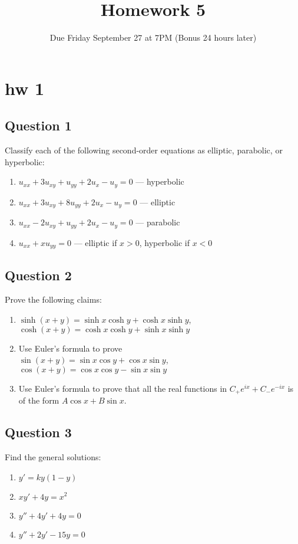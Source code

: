 \documentclass[lang=en,11pt]{template}
\title{Homework 5}
\author{}
\date{Due Friday September 27 at 7PM (Bonus 24 hours later)}
\begin{document}
   

\chapter{hw 1}
\section*{Question 1}
Classify each of the following second-order equations as elliptic, parabolic, or hyperbolic:
\begin{enumerate}
    \item $u_{xx} + 3u_{xy} + u_{yy} + 2u_x - u_y = 0$ --- hyperbolic
    \item $u_{xx} + 3u_{xy} + 8u_{yy} + 2u_x - u_y = 0$ --- elliptic
    \item $u_{xx} - 2u_{xy} + u_{yy} + 2u_x - u_y = 0$ --- parabolic
    \item $u_{xx} + xu_{yy} = 0$ --- elliptic if $x > 0$, hyperbolic if $x < 0$
\end{enumerate}

\section*{Question 2}
Prove the following claims:
\begin{enumerate}
    \item $\sinh(x + y) = \sinh x \cosh y + \cosh x \sinh y$, \\
          $\cosh(x + y) = \cosh x \cosh y + \sinh x \sinh y$
    \item Use Euler’s formula to prove \\
          $\sin(x+y) = \sin x \cos y + \cos x \sin y$, \\
          $\cos(x+y) = \cos x \cos y - \sin x \sin y$
    \item Use Euler’s formula to prove that all the real functions in $C_+e^{ix} + C_-e^{-ix}$ is of the form $A \cos x + B \sin x$.
\end{enumerate}

\section*{Question 3}
Find the general solutions:
\begin{enumerate}
    \item $y' = ky(1 - y)$
    \item $xy' + 4y = x^2$
    \item $y'' + 4y' + 4y = 0$
    \item $y'' + 2y' - 15y = 0$
\end{enumerate}
\end{document}
